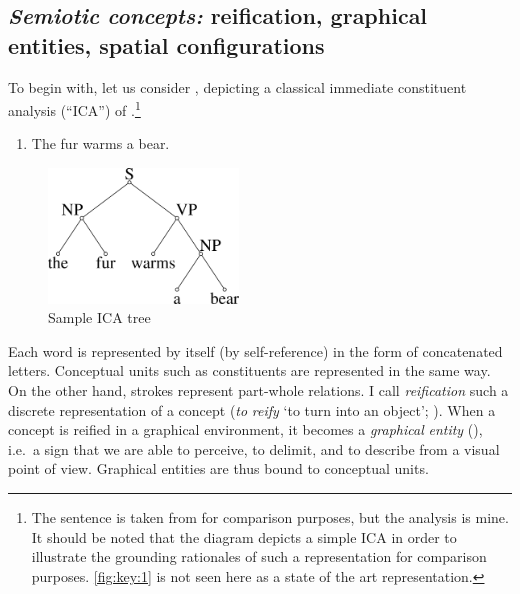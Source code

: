 \documentclass[output=paper]{langsci/langscibook}
\begin{document}
\subsection{\textit{Semiotic} \textit{concepts:} reification, graphical entities, spatial configurations}

To begin with, let us consider , depicting a classical immediate constituent analysis (“ICA”) of .\footnote{ \textrm{The sentence is taken from \citet[44]{clark_normal_1870} for comparison purposes, but the analysis is mine. It should be noted that the diagram depicts a simple ICA in order to illustrate the grounding rationales of such a representation for comparison purposes. \ref{fig:key:1} is not seen here as a state of the art representation.}} 

\ea%
\begin{center}
\begin{enumerate}
    \label{ex:key:(1)}
    \gll\\
        \\
    \glt
    \z
    \centering
      \item The fur warms a bear.
\end{enumerate}
\end{center}

 \begin{figure}
     \centering
     \includegraphics[width=0.45\textwidth]{figures/04/Kap.4.img.0001.png}
     \caption{Sample ICA tree}
     \label{fig:1}
 \end{figure}



Each word is represented by itself (by self-reference) in the form of concatenated letters. Conceptual units such as constituents are represented in the same way. On the other hand, strokes represent part-whole relations. I call \textit{reification} such a discrete representation of a concept (\textit{to} \textit{reify} ‘to turn into an object’; \citealt{kahane_syntactic_2015}). When a concept is reified in a graphical environment, it becomes a \textit{graphical} \textit{entity} (\citealt{groupe__traite_1992}), i.e.~a sign that we are able to perceive, to delimit, and to describe from a visual point of view. Graphical entities are thus bound to conceptual units.
\end{document}
